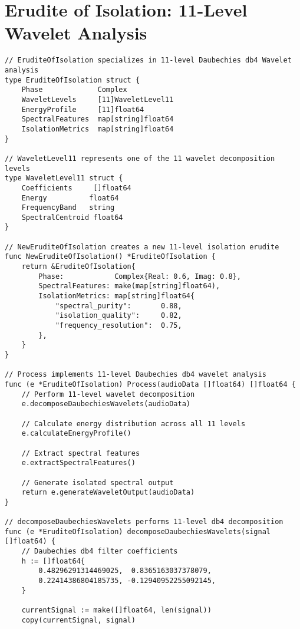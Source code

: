 \section{Erudite of Isolation: 11-Level Wavelet Analysis}

\begin{tcolorbox}[colback=CodeBackground, colframe=DarkGray, title=Erudite of Isolation Implementation, fonttitle=\bfseries]
\begin{verbatim}
// EruditeOfIsolation specializes in 11-level Daubechies db4 Wavelet analysis
type EruditeOfIsolation struct {
    Phase             Complex
    WaveletLevels     [11]WaveletLevel11
    EnergyProfile     [11]float64
    SpectralFeatures  map[string]float64
    IsolationMetrics  map[string]float64
}

// WaveletLevel11 represents one of the 11 wavelet decomposition levels
type WaveletLevel11 struct {
    Coefficients     []float64
    Energy          float64
    FrequencyBand   string
    SpectralCentroid float64
}

// NewEruditeOfIsolation creates a new 11-level isolation erudite
func NewEruditeOfIsolation() *EruditeOfIsolation {
    return &EruditeOfIsolation{
        Phase:            Complex{Real: 0.6, Imag: 0.8},
        SpectralFeatures: make(map[string]float64),
        IsolationMetrics: map[string]float64{
            "spectral_purity":       0.88,
            "isolation_quality":     0.82,
            "frequency_resolution":  0.75,
        },
    }
}

// Process implements 11-level Daubechies db4 wavelet analysis
func (e *EruditeOfIsolation) Process(audioData []float64) []float64 {
    // Perform 11-level wavelet decomposition
    e.decomposeDaubechiesWavelets(audioData)
    
    // Calculate energy distribution across all 11 levels
    e.calculateEnergyProfile()
    
    // Extract spectral features
    e.extractSpectralFeatures()
    
    // Generate isolated spectral output
    return e.generateWaveletOutput(audioData)
}

// decomposeDaubechiesWavelets performs 11-level db4 decomposition
func (e *EruditeOfIsolation) decomposeDaubechiesWavelets(signal []float64) {
    // Daubechies db4 filter coefficients
    h := []float64{
        0.48296291314469025,  0.8365163037378079,
        0.22414386804185735, -0.12940952255092145,
    }
    
    currentSignal := make([]float64, len(signal))
    copy(currentSignal, signal)
    

\end{verbatim}
\end{tcolorbox}
